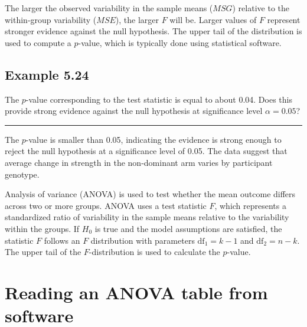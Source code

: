 \documentclass[
  letterpaper,
  DIV=11,
  numbers=noendperiod]{scrreprt}
\begin{document}
The larger the observed variability in the sample means (\(MSG\))
relative to the within-group variability (\(MSE\)), the larger \(F\)
will be. Larger values of \(F\) represent stronger evidence against the
null hypothesis. The upper tail of the distribution is used to compute a
\(p\)-value, which is typically done using statistical software.

\hypertarget{example-5.24}{%
\subsection{Example 5.24}\label{example-5.24}}

The \(p\)-value corresponding to the test statistic is equal to about
0.04. Does this provide strong evidence against the null hypothesis at
significance level \(\alpha = 0.05\)?

\begin{center}\rule{0.5\linewidth}{0.5pt}\end{center}

The \(p\)-value is smaller than 0.05, indicating the evidence is strong
enough to reject the null hypothesis at a significance level of 0.05.
The data suggest that average change in strength in the non-dominant arm
varies by participant genotype.

\begin{tcolorbox}[enhanced jigsaw, toptitle=1mm, colbacktitle=quarto-callout-note-color!10!white, breakable, leftrule=.75mm, left=2mm, opacityback=0, colframe=quarto-callout-note-color-frame, rightrule=.15mm, toprule=.15mm, bottomtitle=1mm, titlerule=0mm, title=\textcolor{quarto-callout-note-color}{\faInfo}\hspace{0.5em}{The \(\pmb{F}\)-statistic and the \(\pmb{F}\)-test}, arc=.35mm, colback=white, bottomrule=.15mm, opacitybacktitle=0.6, coltitle=black]

Analysis of variance (ANOVA) is used to test whether the mean outcome
differs across two or more groups. ANOVA uses a test statistic \(F\),
which represents a standardized ratio of variability in the sample means
relative to the variability within the groups. If \(H_0\) is true and
the model assumptions are satisfied, the statistic \(F\) follows an
\(F\) distribution with parameters \(\textrm{df}_{1}=k-1\) and
\(\textrm{df}_{2}=n-k\). The upper tail of the \(F\)-distribution is
used to calculate the \(p\)-value.

\end{tcolorbox}

\hypertarget{reading-an-anova-table-from-software}{%
\section{Reading an ANOVA table from
software}\label{reading-an-anova-table-from-software}}
\end{document}
